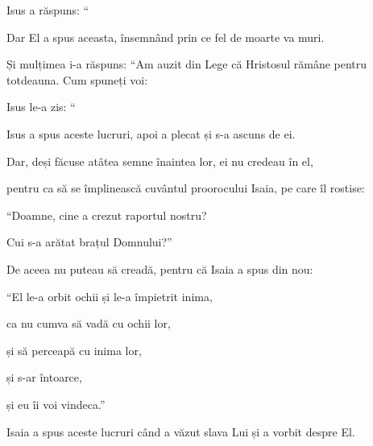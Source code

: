 {\par }{\PP {}Isus a răspuns: “{}



Dar El a spus aceasta, însemnând prin ce fel de moarte va muri.


\par }{\PP {}Și mulțimea i-a răspuns: “Am auzit din Lege că Hristosul rămâne pentru totdeauna. Cum spuneți voi:
{}


\par }{\PP {}Isus le-a zis: “{}

 Isus a spus aceste lucruri, apoi a plecat și s-a ascuns de ei.

Dar, deși făcuse atâtea semne înaintea lor, ei nu credeau în el,

pentru ca să se împlinească cuvântul proorocului Isaia, pe care îl rostise:

\par }{\Q “Doamne, cine a crezut raportul nostru?

\par }{\QB Cui s-a arătat brațul Domnului?”


\par }{\PP {}De aceea nu puteau să creadă, pentru că Isaia a spus din nou:


\par }{\Q {}“El le-a orbit ochii și le-a împietrit inima,

\par }{\QB ca nu cumva să vadă cu ochii lor,

\par }{\QB și să perceapă cu inima lor,

\par }{\QB și s-ar întoarce,

\par }{\QB și eu îi voi vindeca.”


\par }{\PP {}Isaia a spus aceste lucruri când a văzut slava Lui și a vorbit despre El.

}
